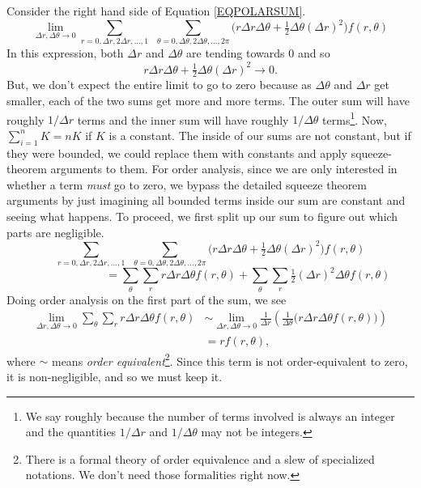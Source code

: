 Consider the right hand side of Equation \eqref{EQPOLARSUM}.
\[
	\lim_{\Delta r,\Delta \theta\to 0}
	\sum_{r=0,\Delta r,2\Delta r,\ldots,1}\ \ \sum_{\theta=0,\Delta\theta,
	2\Delta\theta, \ldots, 2\pi} \Big(
		r\Delta r\Delta \theta + \tfrac{1}{2}\Delta\theta(\Delta r)^2
	\Big)f(r,\theta)
\]
In this expression, both $\Delta r$
and $\Delta \theta$ are tending towards $0$ and so 
\[
	r\Delta r\Delta \theta + \tfrac{1}{2}\Delta\theta(\Delta r)^2\to 0.
\]
But, we don't expect the entire limit to go to zero because as $\Delta\theta$ and $\Delta r$
get smaller, each of the two sums get more and more terms.  The outer sum will have roughly
$1/\Delta r$ terms and the inner sum will have roughly $1/\Delta \theta$ terms\footnote{
We say roughly because the number of terms involved is always an integer and the quantities
$1/\Delta r$ and $1/\Delta \theta$ may not be integers.
}.  
Now, $\sum_{i=1}^n K=nK$ if $K$ is a constant.  The inside of our sums are not constant, but if
they were bounded, we could replace them with constants and apply squeeze-theorem arguments to them.
For order analysis, since we are only interested in whether a term
\emph{must} go to zero, we bypass the detailed squeeze theorem arguments 
by just imagining all bounded terms inside our sum are constant and seeing what happens.
To proceed, we first split up
our sum to figure out which parts are negligible.
\[
			\sum_{r=0,\Delta r,2\Delta r,\ldots,1}\ \ \sum_{\theta=0,\Delta\theta,
	2\Delta\theta, \ldots, 2\pi} \Big(
		r\Delta r\Delta \theta + \tfrac{1}{2}\Delta\theta(\Delta r)^2
		\Big)f(r,\theta)
\]
\[
	\phantom{XXXXXXXX}=\sum_{\theta}\sum_{r} r\Delta r\Delta \theta f(r,\theta)
	+ 
		\sum_{\theta}\sum_{r} \tfrac{1}{2}(\Delta r)^2\Delta \theta f(r,\theta)
\]
Doing order analysis on the first part of the sum, we see
\begin{align*}
	\lim_{\Delta r,\Delta\theta\to 0}
	\sum_{\theta}\sum_{r} r\Delta r\Delta \theta f(r,\theta)
	&\sim
	\lim_{\Delta r,\Delta\theta\to 0}
	\frac{1}{\Delta r}\left(\frac{1}{\Delta \theta} \Big(r\Delta r\Delta\theta f(r,\theta)\Big)\right)\\
	&=rf(r,\theta),
\end{align*}
where $\sim$ means \emph{order equivalent}\footnote{ There is a formal theory of
order equivalence and a slew of specialized notations.  We don't need those formalities
right now.}.  Since this term is not order-equivalent to zero, it is non-negligible, and so 
we must keep it.  

